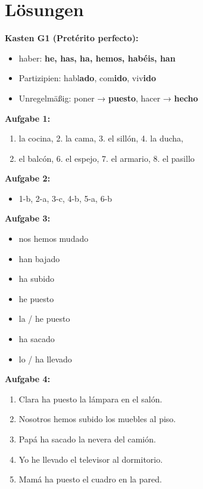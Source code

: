 \documentclass[11pt, a4paper]{article}
\begin{document}

\section*{Lösungen}

\textbf{Kasten G1 (Pretérito perfecto):}
\begin{itemize}[leftmargin=1.5em, itemsep=0pt]
    \item haber: \textbf{he, has, ha, hemos, habéis, han}
    \item Partizipien: habl\textbf{ado}, com\textbf{ido}, viv\textbf{ido}
    \item Unregelmäßig: poner → \textbf{puesto}, hacer → \textbf{hecho}
\end{itemize}

\textbf{Aufgabe 1:}
\begin{enumerate}[leftmargin=1.5em, itemsep=0pt]
    \item la cocina, 2. la cama, 3. el sillón, 4. la ducha,
    \item el balcón, 6. el espejo, 7. el armario, 8. el pasillo
\end{enumerate}

\textbf{Aufgabe 2:}
\begin{itemize}[leftmargin=1.5em, itemsep=0pt]
    \item 1-b, 2-a, 3-c, 4-b, 5-a, 6-b
\end{itemize}

\textbf{Aufgabe 3:}
\begin{itemize}[leftmargin=1.5em, itemsep=0pt]
    \item nos hemos mudado
    \item han bajado
    \item ha subido
    \item he puesto
    \item la / he puesto
    \item ha sacado
    \item lo / ha llevado
\end{itemize}

\textbf{Aufgabe 4:}
\begin{enumerate}[label=\alph*), leftmargin=1.5em, itemsep=0pt]
    \item Clara ha puesto la lámpara en el salón.
    \item Nosotros hemos subido los muebles al piso.
    \item Papá ha sacado la nevera del camión.
    \item Yo he llevado el televisor al dormitorio.
    \item Mamá ha puesto el cuadro en la pared.
\end{enumerate}
\end{document}
